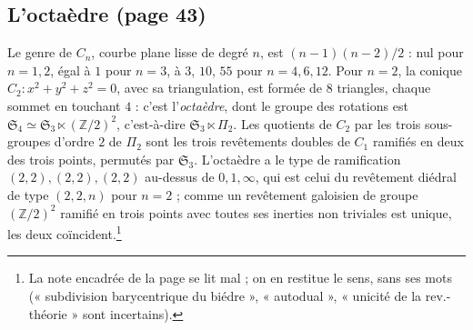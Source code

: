 \documentclass[11pt,a4paper]{article}
\begin{document}
\subsection*{L'octaèdre (page 43)}

Le genre de $C_{n}$, courbe plane lisse de degré $n$, est $(n-1)(n-2)/2$ : nul
pour $n = 1, 2$, égal à $1$ pour $n = 3$, à $3$, $10$, $55$ pour $n = 4, 6, 12$.
Pour $n = 2$, la conique $C_{2} : x^{2} + y^{2} + z^{2} = 0$, avec sa
triangulation, est formée de $8$ triangles, chaque sommet en touchant $4$ :
c'est l'\emph{octaèdre}, dont le groupe des rotations est $\mathfrak{S}_{4}
\simeq \mathfrak{S}_{3} \ltimes (\mathbb{Z}/2)^{2}$, c'est-à-dire
$\mathfrak{S}_{3} \ltimes \Pi_{2}$. Les quotients de $C_{2}$ par les trois
sous-groupes d'ordre $2$ de $\Pi_{2}$ sont les trois revêtements doubles de
$C_{1}$ ramifiés en deux des trois points, permutés par $\mathfrak{S}_{3}$.
L'octaèdre a le type de ramification $(2, 2), (2, 2), (2, 2)$ au-dessus de $0, 1,
\infty$, qui est celui du revêtement diédral de type $(2, 2, n)$ pour $n = 2$ ;
comme un revêtement galoisien de groupe $(\mathbb{Z}/2)^{2}$ ramifié en trois
points avec toutes ses inerties non triviales est unique, les deux
coïncident.\footnote{La note encadrée de la page se lit mal ; on en restitue le
sens, sans ses mots (« subdivision barycentrique du biédre », « autodual »,
« unicité de la rev.-théorie » sont incertains).}
\end{document}
